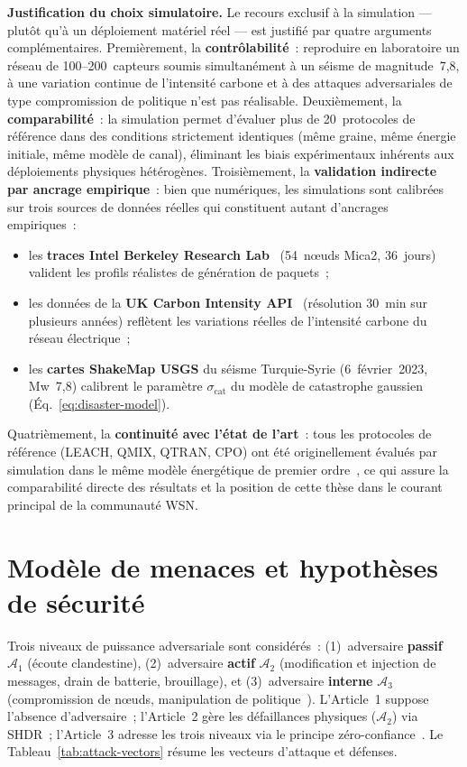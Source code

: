 \medskip
\noindent\textbf{Justification du choix simulatoire.}
Le recours exclusif à la simulation --- plutôt qu'à un déploiement matériel réel --- est justifié par quatre arguments complémentaires. Premièrement, la \textbf{contrôlabilité}~: reproduire en laboratoire un réseau de 100--200~capteurs soumis simultanément à un séisme de magnitude~7,8, à une variation continue de l'intensité carbone et à des attaques adversariales de type compromission de politique n'est pas réalisable. Deuxièmement, la \textbf{comparabilité}~: la simulation permet d'évaluer plus de 20~protocoles de référence dans des conditions strictement identiques (même graine, même énergie initiale, même modèle de canal), éliminant les biais expérimentaux inhérents aux déploiements physiques hétérogènes. Troisièmement, la \textbf{validation indirecte par ancrage empirique}~: bien que numériques, les simulations sont calibrées sur trois sources de données réelles qui constituent autant d'ancrages empiriques~:
\begin{itemize}
    \item les \textbf{traces Intel Berkeley Research Lab}~\cite{intel_lab_data} (54~nœuds Mica2, 36~jours) valident les profils réalistes de génération de paquets~;
    \item les données de la \textbf{UK Carbon Intensity API}~\cite{uk_carbon_api} (résolution 30~min sur plusieurs années) reflètent les variations réelles de l'intensité carbone du réseau électrique~;
    \item les \textbf{cartes ShakeMap USGS} du séisme Turquie-Syrie (6~février~2023, Mw~7,8) calibrent le paramètre $\sigma_{\text{cat}}$ du modèle de catastrophe gaussien (Éq.~\ref{eq:disaster-model}).
\end{itemize}
Quatrièmement, la \textbf{continuité avec l'état de l'art}~: tous les protocoles de référence (LEACH, QMIX, QTRAN, CPO) ont été originellement évalués par simulation dans le même modèle énergétique de premier ordre~\cite{heinzelman2000leach}, ce qui assure la comparabilité directe des résultats et la position de cette thèse dans le courant principal de la communauté WSN.


\section{Modèle de menaces et hypothèses de sécurité}\label{sec:demarche-threat}

Trois niveaux de puissance adversariale sont considérés~: (1)~adversaire \textbf{passif} $\mathcal{A}_1$ (écoute clandestine), (2)~adversaire \textbf{actif} $\mathcal{A}_2$ (modification et injection de messages, drain de batterie, brouillage), et (3)~adversaire \textbf{interne} $\mathcal{A}_3$ (compromission de n\oe{}uds, manipulation de politique~\cite{Gleave2020AdvPolicies, Kiourti2021BackdoorDRL}). L'Article~1 suppose l'absence d'adversaire~; l'Article~2 gère les défaillances physiques ($\mathcal{A}_2$) via SHDR~; l'Article~3 adresse les trois niveaux via le principe zéro-confiance~\cite{rose2020nist}. Le Tableau~\ref{tab:attack-vectors} résume les vecteurs d'attaque et défenses.

